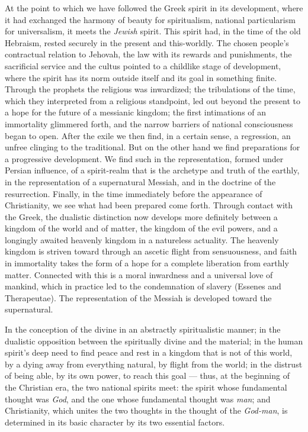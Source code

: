 \documentclass[12pt,a4paper,openany]{book}
\newcommand{\opage}[1]{\marginnote{\footnotesize\textit{[#1]}}}
\begin{document}
At the point to which we have followed the Greek
spirit in its development, where it had exchanged the harmony of beauty
for spiritualism, national particularism
for universalism, it meets the \emph{Jewish} spirit.
This spirit had, in the time of the old Hebraism, rested securely in the
\opage{446}present and this-worldly. The chosen people's contractual relation
to Jehovah, the law with its rewards and punishments,
the sacrificial service and the cultus pointed to a childlike stage of development,
where the spirit has its norm outside itself and its goal
in something finite. Through the prophets the religious was inwardized;
the tribulations of the time, which they interpreted from a religious
standpoint, led out beyond the present to a hope for the future
of a messianic kingdom; the first intimations of an immortality
glimmered forth, and the narrow barriers of national consciousness
began to open. After the exile we then find, in a certain
sense, a regression, an unfree clinging to the traditional.
But on the other hand we find preparations
for a progressive development. We find such in the
representation, formed under Persian influence, of a
spirit-realm that is the archetype and truth of the earthly, in the representation
of a supernatural Messiah, and in the doctrine of the resurrection.
Finally, in the time immediately before the appearance of Christianity,
we see what had been prepared come forth. Through contact with the
Greek, the dualistic distinction now develops more definitely
between a kingdom of the world and of matter, the kingdom of the evil powers,
and a longingly awaited heavenly kingdom in a natureless
actuality. The heavenly kingdom is striven toward
through an ascetic flight from sensuousness, and faith in immortality
takes the form of a hope for a complete
liberation from earthly matter. Connected with this
is a moral inwardness and a universal love of mankind, which
in practice led to the condemnation of slavery (Essenes and Therapeutae).
The representation of the Messiah is developed toward the supernatural.

In the conception of the divine in an abstractly spiritualistic
manner; in the dualistic opposition between the
spiritually divine and the material; in the human spirit's
deep need to find peace and rest in a kingdom that is not
of this world, by a dying away from everything natural,
by flight from the world; in the distrust of being able, by its own power,
to reach this goal --- thus, at the beginning of the Christian
era, the two national spirits meet: the spirit whose fundamental
\opage{447}thought was \emph{God}, and the one whose fundamental thought was \emph{man};
and Christianity, which unites the two thoughts in the thought of the \emph{God-man},
is determined in its basic character by its
two essential factors.
\end{document}
